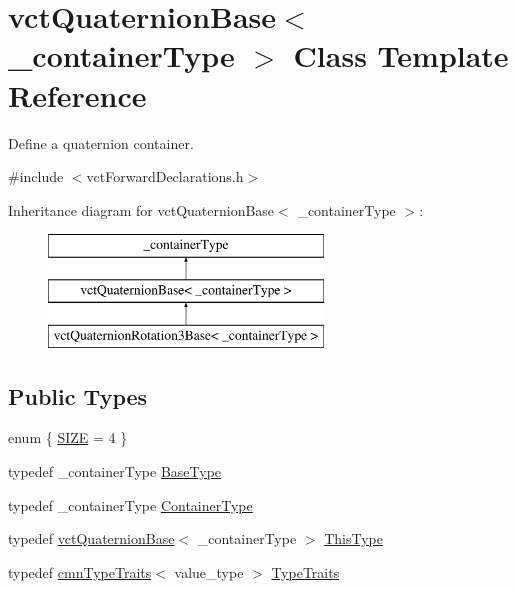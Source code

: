 \hypertarget{classvct_quaternion_base}{}\section{vct\+Quaternion\+Base$<$ \+\_\+container\+Type $>$ Class Template Reference}
\label{classvct_quaternion_base}


Define a quaternion container.  




{\ttfamily \#include $<$vct\+Forward\+Declarations.\+h$>$}

Inheritance diagram for vct\+Quaternion\+Base$<$ \+\_\+container\+Type $>$\+:\begin{figure}[H]
\begin{center}
\leavevmode
\includegraphics[height=3.000000cm]{d2/dd4/classvct_quaternion_base}
\end{center}
\end{figure}
\subsection*{Public Types}
\begin{DoxyCompactItemize}
\item 
enum \{ \hyperlink{classvct_quaternion_base_a4cebcfc5f0fce9b5ead4e1e01fa8d868afd9c7f6b98e709b1a5c12c86e6a7ee8f}{S\+I\+Z\+E} = 4
 \}
\item 
typedef \+\_\+container\+Type \hyperlink{classvct_quaternion_base_a342c9d5a6e43b2e9e5325edcb5ebadbc}{Base\+Type}
\item 
typedef \+\_\+container\+Type \hyperlink{classvct_quaternion_base_ad9916f63417895bf3ac6ad6cd753cb47}{Container\+Type}
\item 
typedef \hyperlink{classvct_quaternion_base}{vct\+Quaternion\+Base}$<$ \+\_\+container\+Type $>$ \hyperlink{classvct_quaternion_base_af28efdc38acf89acb7a67afada11408c}{This\+Type}
\item 
typedef \hyperlink{classcmn_type_traits}{cmn\+Type\+Traits}$<$ value\+\_\+type $>$ \hyperlink{classvct_quaternion_base_a4c70fa57d856488a018b94b70d61b25c}{Type\+Traits}
\end{DoxyCompactItemize}
